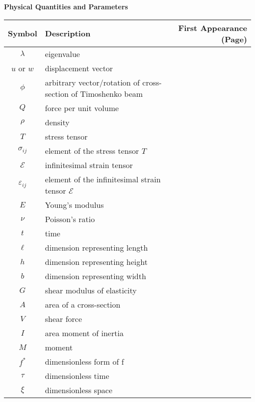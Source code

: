 \documentclass[main.tex]{subfiles}
\begin{document}
\noindent
\textbf{Physical Quantities and Parameters}\\
\begin{tabularx}{\textwidth}{cXr}
\toprule
Symbol & Description & First Appearance (Page) \\ 
\midrule
\( \lambda \) & eigenvalue & \pageref{sym:lambda} \\
\( u \) or \( w \) & displacement vector & \pageref{sym:u} \\
\( \phi \) & arbitrary vector/rotation of cross-section of Timoshenko beam & \pageref{sym:phi} \\
\( Q \) & force per unit volume & \pageref{sym:Q} \\
\( \rho \) & density & \pageref{sym:rho} \\
\( T \) & stress tensor & \pageref{sym:T} \\
\( \sigma_{ij} \) & element of the stress tensor \( T \) & \pageref{sym:sigmaij} \\
\( \mathcal{E} \) & infinitesimal strain tensor & \pageref{sym:mathcalE} \\
\( \varepsilon_{ij} \) & element of the infinitesimal strain tensor \( \mathcal{E} \) & \pageref{sym:varepsilonij} \\
\( E \) & Young's modulus & \pageref{sym:E} \\
\( \nu \) & Poisson's ratio & \pageref{sym:nu} \\
\( t \) & time & \pageref{sym:t} \\
\( \ell \) & dimension representing length & \pageref{sym:ell} \\
\( h \) & dimension representing height & \pageref{sym:height} \\
\( b \) &  dimension representing width & \pageref{sym:width} \\
\( G \) & shear modulus of elasticity & \pageref{sym:G} \\
\( A \) & area of a cross-section & \pageref{sym:A} \\
\( V \) & shear force & \pageref{sym:V} \\
\( I \) & area moment of inertia & \pageref{sym:Iinertia} \\
\( M \) & moment & \pageref{sym:M} \\
\( f^* \) & dimensionless form of f & \pageref{sym:sigmaijstar} \\
\( \tau \) & dimensionless time & \pageref{sym:tau} \\
\( \xi \) & dimensionless space & \pageref{sym:xi} \\

\end{tabularx}
\end{document}
